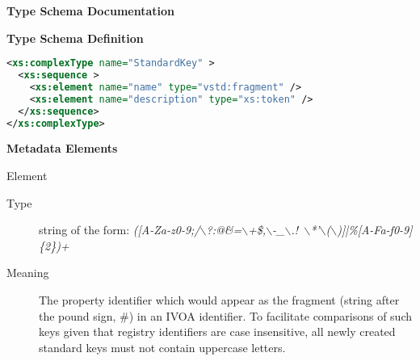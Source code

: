 \documentclass[11pt,a4paper]{ivoa}
\begin{document}
\begin{generated}
\begingroup
        \renewcommand*\descriptionlabel[1]{%
        \hbox to 5.5em{\emph{#1}\hfil}}\vspace{2ex}\noindent\textbf{ Type Schema Documentation}




\vspace{1ex}\noindent\textbf{ Type Schema Definition}

\begin{lstlisting}[language=XML,basicstyle=\footnotesize]
<xs:complexType name="StandardKey" >
  <xs:sequence >
    <xs:element name="name" type="vstd:fragment" />
    <xs:element name="description" type="xs:token" />
  </xs:sequence>
</xs:complexType>
\end{lstlisting}

\vspace{0.5ex}\noindent\textbf{ Metadata Elements}

\begingroup\small\begin{bigdescription}\item[Element \xmlel{name}]
\begin{description}
\item[Type] string of the form: \emph{([A-Za-z0-9;/$\backslash$?:@\&=$\backslash$+\$,$\backslash$-\_$\backslash$.!~$\backslash$*'$\backslash$($\backslash$)]|\%[A-Fa-f0-9]\{2\})+}
\item[Meaning] 
                  The property identifier which would appear as the
                  fragment (string after the pound sign, \#) in an IVOA
                  identifier.
                  To facilitate comparisons of such keys given that
                  registry identifiers are case insensitive, all newly
                  created standard keys must not contain uppercase letters.
               

\end{description}
\end{bigdescription}
\end{generated}
\end{document}
